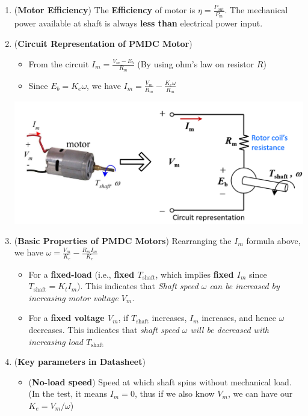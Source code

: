 \documentclass[10pt, landscape]{article}
\begin{document}
\begin{multicols}{4}
\begin{enumerate}
\begin{itemize}
    \end{itemize}
    \item (\textbf{Motor Efficiency}) The \textbf{Efficiency} of motor is $\eta=\frac{P_{\text{out}}}{P_{\text{in}}}$. The mechanical power available at shaft is always \textbf{less than} electrical power input.
    \item (\textbf{Circuit Representation of PMDC Motor})
    \begin{itemize}
        \item From the circuit $I_m=\frac{V_m-E_b}{R_m}$ (By using ohm's law on resistor $R$)
        \item Since $E_b=K_e\omega$, we have $I_m=\frac{V_m}{R_m}-\frac{K_e\omega}{R_m}$
    \end{itemize}
    \centerline{\includegraphics[width=0.9\linewidth]{images/circuit-representation-PMDC-motor.png}}
    \item (\textbf{Basic Properties of PMDC Motors}) Rearranging the $I_m$ formula above, we have $\omega = \frac{V_m}{K_e}-\frac{R_mI_m}{K_e}$
    \begin{itemize}
        \item For a \textbf{fixed-load} (i.e., \textbf{fixed $T_{\text{shaft}}$}, which implies \textbf{fixed $I_m$} since $T_{\text{shaft}}=K_tI_m$). This indicates that \textit{Shaft speed $\omega$ can be increased by increasing motor voltage $V_m$}.
        \item For a \textbf{fixed voltage $V_m$}, if $T_{\text{shaft}}$ increases, $I_m$ increases, and hence $\omega$ decreases. This indicates that \textit{shaft speed $\omega$ will be decreased with increasing load $T_{\text{shaft}}$}
    \end{itemize}
    \item (\textbf{Key parameters in Datasheet})
    \begin{itemize}
        \item (\textbf{No-load speed}) Speed at which shaft spins without mechanical load. (In the test, it means $I_m=0$, thus if we also know $V_m$, we can have our $K_e=V_m/\omega$)

\end{itemize}
\end{enumerate}
\end{multicols}
\end{document}
